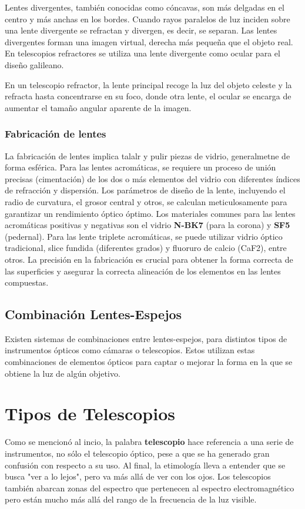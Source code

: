 Lentes divergentes, también conocidas como cóncavas, son más delgadas en el centro y más anchas en los bordes. Cuando rayos paralelos de luz inciden sobre una lente divergente se refractan y divergen, es decir, se separan. Las lentes divergentes forman una imagen virtual, derecha más pequeña que el objeto real. En telescopios refractores se utiliza una lente divergente como ocular para el diseño galileano. 

En un telescopio refractor, la lente principal recoge la luz del objeto celeste y la refracta hasta concentrarse en su foco, donde otra lente, el ocular se encarga de aumentar el tamaño angular aparente de la imagen. 

\subsubsection{Fabricación de lentes}

La fabricación de lentes implica talalr y pulir piezas de vidrio, generalmetne de forma esférica. Para las lentes acromáticas, se requiere un proceso de unión precisas (cimentación) de los dos o más elementos del vidrio con diferentes índices de refracción y dispersión. Los parámetros de diseño de la lente, incluyendo el radio de curvatura, el grosor central y otros, se calculan meticulosamente para garantizar un rendimiento óptico óptimo. Los materiales comunes para las lentes acromáticas positivas y negativas son el vidrio \textbf{N-BK7} (para la corona) y \textbf{SF5} (pedernal). Para las lente triplete acromáticas, se puede utilizar vidrio óptico tradicional, slice fundida (diferentes grados) y fluoruro de calcio (CaF2), entre otros. La precisión en la fabricación es crucial para obtener la forma correcta de las superficies y asegurar la correcta alineación de los elementos en las lentes compuestas. 

\subsection{Combinación Lentes-Espejos}

Existen sistemas de combinaciones entre lentes-espejos, para distintos tipos de instrumentos ópticos como cámaras o telescopios. Estos utilizan estas combinaciones de elementos ópticos para captar o mejorar la forma en la que se obtiene la luz de algún objetivo. 



\section{Tipos de Telescopios}
Como se mencionó al incio, la palabra \textbf{telescopio} hace referencia a una serie de instrumentos, no sólo el telescopio óptico, pese a que se ha generado gran confusión con respecto a su uso. Al final, la etimología lleva a entender que se busca "ver a lo lejos", pero va más allá de ver con los ojos. Los telescopios también abarcan zonas del espectro que pertenecen al espectro electromagnético pero están mucho más allá del rango de la frecuencia de la luz visible. 

